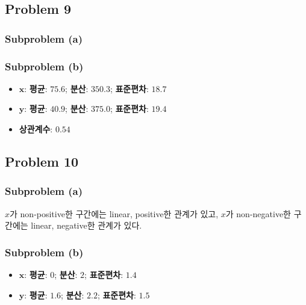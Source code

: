 \documentclass{article}
\begin{document}
\subsection*{Problem 9}

\subsubsection*{Subproblem (a)}



\subsubsection*{Subproblem (b)}

\begin{itemize}
	\item $\mathbf{x}$: \textbf{평균}: $75.6$; \textbf{분산}: $350.3$; \textbf{표준편차}: $18.7$
	\item $\mathbf{y}$: \textbf{평균}: $40.9$; \textbf{분산}: $375.0$; \textbf{표준편차}: $19.4$
	\item \textbf{상관계수}: $0.54$
\end{itemize}

\subsection*{Problem 10}

\subsubsection*{Subproblem (a)}



$x$가 non-positive한 구간에는 linear, positive한 관계가 있고,
$x$가 non-negative한 구간에는 linear, negative한 관계가 있다.

\subsubsection*{Subproblem (b)}

\begin{itemize}
	\item $\mathbf{x}$: \textbf{평균}: $0$; \textbf{분산}: $2$; \textbf{표준편차}: $1.4$
	\item $\mathbf{y}$: \textbf{평균}: $1.6$; \textbf{분산}: $2.2$; \textbf{표준편차}: $1.5$
\end{itemize}
\end{document}
